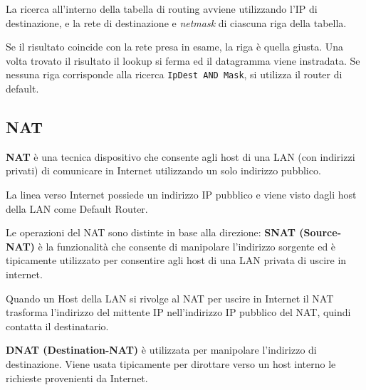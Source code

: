             La ricerca all'interno della tabella di routing avviene utilizzando l'IP di destinazione, e la rete di destinazione e \textit{netmask} di ciascuna riga della tabella.
        
            Se il risultato coincide con la rete presa in esame, la riga è quella giusta. Una volta trovato il risultato il lookup si ferma ed il datagramma viene instradata. Se nessuna riga corrisponde alla ricerca \verb:IpDest AND Mask:, si utilizza il router di default.
        
    \subsection{NAT}
        \textbf{NAT} è una tecnica dispositivo che consente agli host di una LAN (con indirizzi privati) di comunicare in Internet utilizzando un solo indirizzo pubblico.
    
        La linea verso Internet possiede un indirizzo IP pubblico e viene visto dagli host della LAN come Default Router.
    
        Le operazioni del NAT sono distinte in base alla direzione: \textbf{SNAT (Source-NAT)} è la funzionalità che consente di manipolare l'indirizzo sorgente ed è tipicamente utilizzato per consentire agli host di una LAN privata di uscire in internet.
    
        Quando un Host della LAN si rivolge al NAT per uscire in Internet il NAT trasforma l'indirizzo del mittente IP nell'indirizzo IP pubblico del NAT, quindi contatta il destinatario.
    
        \textbf{DNAT (Destination-NAT)} è utilizzata per manipolare l'indirizzo di destinazione. Viene usata tipicamente per dirottare verso un host interno le richieste provenienti da Internet.

